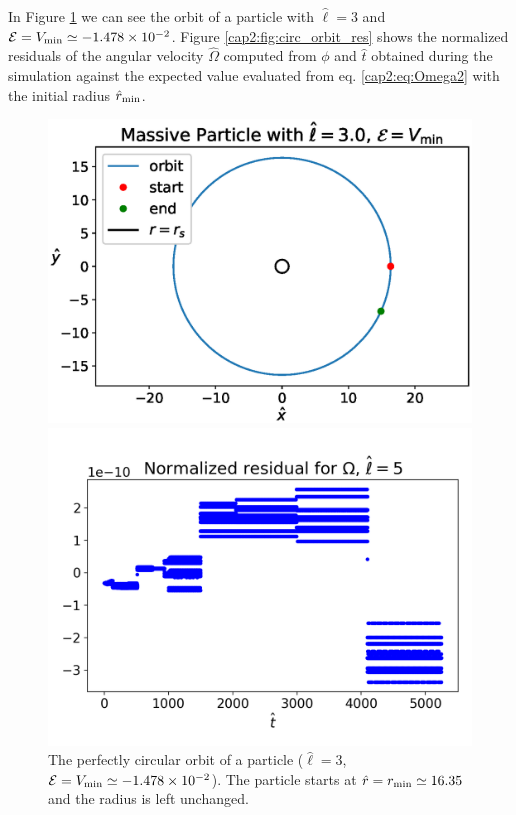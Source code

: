 In Figure \ref{cap2:fig:circ_orbit} we can see the orbit of a particle with
$\hat \ell = 3$ and $\mathcal E = V_{\rm min} \simeq
\num{-1.478e-02}$.
Figure \ref{cap2:fig:circ_orbit_res} shows the normalized residuals of the
angular velocity $\hat \Omega$ computed from $\phi$ and $\hat t$ obtained
during the simulation against the expected value evaluated from eq.
\ref{cap2:eq:Omega2} with the initial radius $\hat r_{\rm min}$.

\begin{figure}[h]
    \begin{minipage}{0.48\textwidth}
        \centering
        \includegraphics[width=\textwidth]{Figures/chapter2/circ.eps}
        \caption{The perfectly circular orbit of a particle ($\hat \ell = 3$,
        $\mathcal E = V_{\rm min} \simeq \num{-1.478e-02}$).
        The particle starts at $\hat r = r_{\rm min} \simeq 16.35$ and the
        radius is left unchanged.}
        \label{cap2:fig:circ_orbit}
    \end{minipage}
    \hspace{0.015 \textwidth}
    \begin{minipage}{0.48\textwidth}
        \centering
        \includegraphics[width=1.08\textwidth]{Figures/chapter2/circ_res.png}

\end{minipage}
\end{figure}

